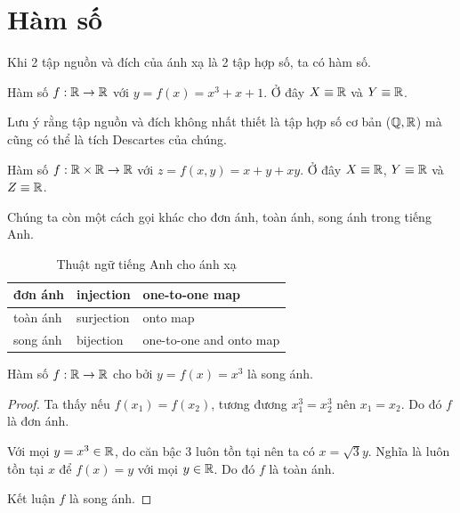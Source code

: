 \section{Hàm số}

Khi 2 tập nguồn và đích của ánh xạ là 2 tập hợp số, ta có hàm số.

\begin{example}
    Hàm số $f: \mathbb{R} \rightarrow \mathbb{R}$ với $y = f(x) = x^3 + x + 1$. Ở đây $X \equiv \mathbb{R}$ và $Y \equiv \mathbb{R}$.
\end{example}

Lưu ý rằng tập nguồn và đích không nhất thiết là tập hợp số cơ bản ($\mathbb{Q}, \mathbb{R}$) mà cũng có thể là tích Descartes của chúng.

\begin{example}
    Hàm số $f: \mathbb{R} \times \mathbb{R} \rightarrow \mathbb{R}$ với $z = f(x, y) = x + y + xy$. Ở đây $X \equiv \mathbb{R}$, $Y \equiv \mathbb{R}$ và $Z \equiv \mathbb{R}$.
\end{example}

Chúng ta còn một cách gọi khác cho đơn ánh, toàn ánh, song ánh trong tiếng Anh.

\begin{table}[ht]
    \centering
    \begin{tabular}{| l | l | l |}
        \hline
        đơn ánh & injection & one-to-one map \\
        \hline
        toàn ánh & surjection & onto map \\
        \hline
        song ánh & bijection & one-to-one and onto map \\
        \hline
    \end{tabular}

    \caption{Thuật ngữ tiếng Anh cho ánh xạ}
\end{table}

\begin{example}
    Hàm số $f: \mathbb{R} \rightarrow \mathbb{R}$ cho bởi $y = f(x) = x^3$ là song ánh.

    \begin{proof}
        Ta thấy nếu $f(x_1) = f(x_2)$, tương đương $x_1^3 = x_2^3$ nên $x_1 = x_2$. Do đó $f$ là đơn ánh.

        Với mọi $y = x^3 \in \mathbb{R}$, do căn bậc 3 luôn tồn tại nên ta có $x = \sqrt{3}{y}$. Nghĩa là luôn tồn tại $x$ để $f(x) = y$ với mọi $y \in \mathbb{R}$. Do đó $f$ là toàn ánh.

        Kết luận $f$ là song ánh.
    \end{proof}
\end{example}

